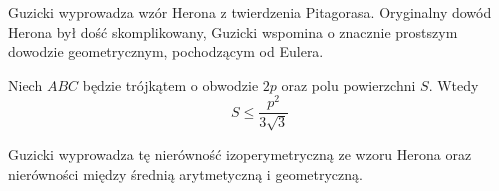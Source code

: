 %

Guzicki \cite[s. 165-168]{guzicki_2021} wyprowadza wzór Herona z twierdzenia Pitagorasa.
Oryginalny dowód Herona był dość skomplikowany, Guzicki \cite[s. 168-169]{guzicki_2021} wspomina o znacznie prostszym dowodzie geometrycznym, pochodzącym od Eulera.
%

\begin{proposition}
	Niech $ABC$ będzie trójkątem o obwodzie $2p$ oraz polu powierzchni $S$.
	Wtedy
	\begin{equation}
		S \le \frac{p^2}{3 \sqrt{3}}
	\end{equation}
\end{proposition}

Guzicki wyprowadza tę nierówność izoperymetryczną ze wzoru Herona oraz nierówności między średnią arytmetyczną i geometryczną.


%